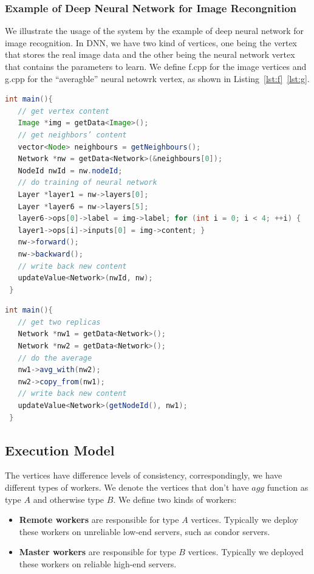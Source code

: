 \documentclass[11pt]{article}
\begin{document}
\subsubsection{Example of Deep Neural Network for Image Recongnition}
We illustrate the usage of the system by the example of deep neural
network	for image recognition. In DNN, we have two kind of vertices, one 
being the vertex that stores the real image data and the other being the neural 
network vertex that contains the parameters to learn. 
We define \textsf{f.cpp} for the image vertices and \textsf{g.cpp} for the 
``averagble'' neural netowrk vertex, as shown in Listing~\ref{lst:f}~\ref{lst:g}.
\begin{lstlisting}[language=java,basicstyle={\ttfamily\small},caption={f.cpp},label={lst:f},frame=single]
 int main(){ 
   // get vertex content
   Image *img = getData<Image>();
   // get neighbors’ content 
   vector<Node> neighbours = getNeighbours(); 
   Network *nw = getData<Network>(&neighbours[0]); 
   NodeId nwId = nw.nodeId;
   // do training of neural network
   Layer *layer1 = nw->layers[0];
   Layer *layer6 = nw->layers[5];
   layer6->ops[0]->label = img->label; for (int i = 0; i < 4; ++i) {
   layer1->ops[i]->inputs[0] = img->content; }
   nw->forward();
   nw->backward();
   // write back new content 
   updateValue<Network>(nwId, nw);
 }
\end{lstlisting}
\begin{lstlisting}[language=java,basicstyle={\ttfamily\small},caption={g.cpp},label={lst:g},frame=single]
 int main(){ 
   // get two replicas 
   Network *nw1 = getData<Network>(); 
   Network *nw2 = getData<Network>();
   // do the average 
   nw1->avg_with(nw2); 
   nw2->copy_from(nw1);
   // write back new content 
   updateValue<Network>(getNodeId(), nw1);
 } 
\end{lstlisting}

\subsection{Execution Model}
The vertices have difference levels of consistency, correspondingly, we have 
different types of workers. We denote the vertices that don't have $agg$ 
function as type $A$ and otherwise type $B$. We define two kinds of workers:
\begin{itemize}
 \item \textbf{Remote workers} are responsible for type $A$ vertices. Typically we 
deploy these workers on unreliable low-end servers, such as condor servers.
 \item \textbf{Master workers} are responsible for type $B$ vertices. Typically we 
deployed these workers on reliable high-end servers.
\end{itemize}
\end{document}
